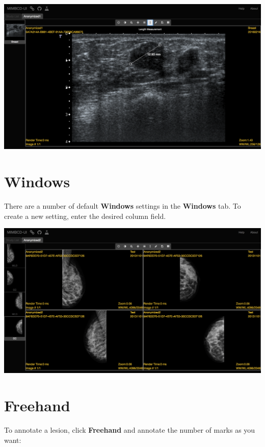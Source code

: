 \documentclass{tufte-book} %
\begin{document}
\begin{center}
\includegraphics[width=\textwidth]{graphics/anon1_length.png}
\end{center}

\chapter{Windows}

There are a number of default \textbf{Windows} settings in the \textbf{Windows} tab. To create a new setting, enter the desired column field.

\begin{center}
\includegraphics[width=\textwidth]{graphics/anon1_windows.png}
\end{center}

\chapter{Freehand}

To annotate a lesion, click \textbf{Freehand} and annotate the number of marks as you want:
\end{document}
